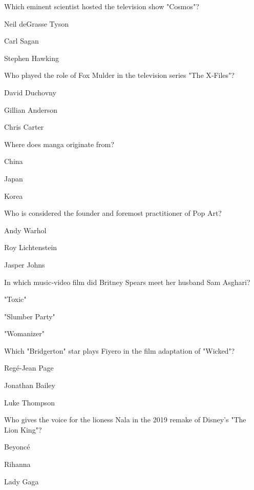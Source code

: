 \begin{enhancedmcq}{Which eminent scientist hosted the television show "Cosmos"?}
\item Neil deGrasse Tyson
\item Carl Sagan
\item Stephen Hawking

\end{enhancedmcq}
\begin{enhancedmcq}{Who played the role of Fox Mulder in the television series "The X‑Files"?}
\item David Duchovny
\item Gillian Anderson
\item Chris Carter

\end{enhancedmcq}
\begin{enhancedmcq}{Where does manga originate from?}
\item China
\item Japan
\item Korea

\end{enhancedmcq}
\begin{enhancedmcq}{Who is considered the founder and foremost practitioner of Pop Art?}
\item Andy Warhol
\item Roy Lichtenstein
\item Jasper Johns

\end{enhancedmcq}
\begin{enhancedmcq}{In which music‑video film did Britney Spears meet her husband Sam Asghari?}
\item "Toxic"
\item "Slumber Party"
\item "Womanizer"

\end{enhancedmcq}
\begin{enhancedmcq}{Which "Bridgerton" star plays Fiyero in the film adaptation of "Wicked"?}
\item Regé‑Jean Page
\item Jonathan Bailey
\item Luke Thompson

\end{enhancedmcq}
\begin{enhancedmcq}{Who gives the voice for the lioness Nala in the 2019 remake of Disney's "The Lion King"?}
\item Beyoncé
\item Rihanna
\item Lady Gaga

\end{enhancedmcq}
